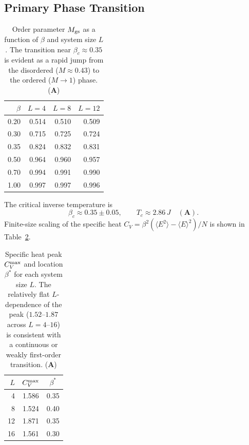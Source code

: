 \documentclass[11pt]{article}
\theoremstyle{remark}
\newcommand{\CatA}{\textbf{A}}
\begin{document}
\subsection{Primary Phase Transition}

\begin{table}[htb]
\centering
\caption{Order parameter $M_{\rm gs}$ as a function of $\beta$ and system size $L$.
The transition near $\beta_c \approx 0.35$ is evident as a rapid jump from the
disordered ($M \approx 0.43$) to the ordered ($M \to 1$) phase. (\CatA{})}
\label{tab:orderparam}
\begin{tabular}{@{}rrrr@{}}
\toprule
$\beta$ & $L=4$ & $L=8$ & $L=12$ \\
\midrule
0.20 & 0.514 & 0.510 & 0.509 \\
0.30 & 0.715 & 0.725 & 0.724 \\
0.35 & 0.824 & 0.832 & 0.831 \\
0.50 & 0.964 & 0.960 & 0.957 \\
0.70 & 0.994 & 0.991 & 0.990 \\
1.00 & 0.997 & 0.997 & 0.996 \\
\bottomrule
\end{tabular}
\end{table}

The critical inverse temperature is
\begin{equation}
  \beta_c \approx 0.35 \pm 0.05, \qquad T_c \approx 2.86\,J \quad (\CatA{}).
\end{equation}
Finite-size scaling of the specific heat $C_V = \beta^2 (\langle E^2 \rangle -
\langle E \rangle^2)/N$ is shown in Table~\ref{tab:cv}.

\begin{table}[htb]
\centering
\caption{Specific heat peak $C_V^{\rm max}$ and location $\beta^*$ for each
system size $L$. The relatively flat $L$-dependence of the peak ($1.52$--$1.87$
across $L = 4$--$16$) is consistent with a continuous or weakly first-order
transition. (\CatA{})}
\label{tab:cv}
\begin{tabular}{@{}rcc@{}}
\toprule
$L$ & $C_V^{\rm max}$ & $\beta^*$ \\
\midrule
4  & 1.586 & 0.35 \\
8  & 1.524 & 0.40 \\
12 & 1.871 & 0.35 \\
16 & 1.561 & 0.30 \\
\bottomrule
\end{tabular}
\end{table}
\end{document}
